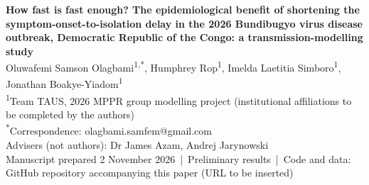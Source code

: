 \documentclass[11pt,a4paper]{article}
\begin{document}
\thispagestyle{empty}
\begin{center}
{\LARGE\bfseries How fast is fast enough? The epidemiological benefit of shortening the symptom-onset-to-isolation delay in the 2026 Bundibugyo virus disease outbreak, Democratic Republic of the Congo: a transmission-modelling study}\\[10pt]
{\large Oluwafemi Samson Olagbami\textsuperscript{1,*}, Humphrey Rop\textsuperscript{1}, Imelda Laetitia Simboro\textsuperscript{1}, Jonathan Boakye-Yiadom\textsuperscript{1}}\\[4pt]
{\small\textsuperscript{1}Team TAUS, 2026 MPPR group modelling project (institutional affiliations to be completed by the authors)\\
\textsuperscript{*}Correspondence: olagbami.samfem@gmail.com}\\[4pt]
{\small Advisers (not authors): Dr James Azam, Andrej Jarynowski}\\[2pt]
{\small Manuscript prepared 2 November 2026 \,|\, Preliminary results \,|\, Code and data: GitHub repository accompanying this paper (URL to be inserted)}
\end{center}
\vspace{4pt}
\end{document}
